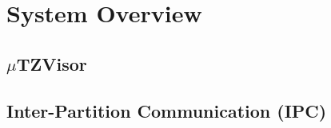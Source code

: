 
\section{System Overview}

\subsection{\(\mu\)TZVisor}

\subsection{Inter-Partition Communication (IPC)}

